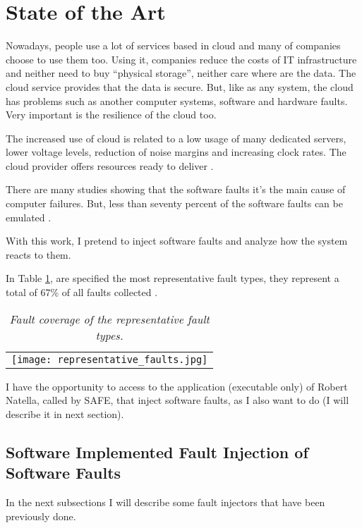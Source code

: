 \newpage
\section{State of the Art}

Nowadays, people use a lot of services based in cloud and many of companies choose to use them too. Using it, companies reduce the costs of IT infrastructure and neither need to buy ``physical storage'', neither care where are the data. The cloud service provides that the data is secure.
But, like as any system, the cloud has problems such as another computer systems, software and hardware faults. Very important is the resilience of the cloud too.

The increased use of cloud is related to a low usage of many dedicated servers, lower voltage levels, reduction of noise margins and increasing clock rates. The cloud provider offers resources ready to deliver \cite{wolter2012resilience}.

There are many studies showing that the software faults\cite{avizzienisbasic} it's the main cause of computer failures. But, less than seventy percent of the software faults can be emulated \cite{madeira2000emulation}.

With this work, I pretend to inject software faults and analyze how the system reacts to them.

In Table \ref{tab:representative_faults}, are specified the most representative fault types, they represent a total of 67\% of all faults collected \cite{duraes2005thesis}.

\begin{table}[!ht]
\begin{tabular}{c}
\texttt{[image: representative\_faults.jpg]}
\end{tabular}
\caption{\small \sl Fault coverage of the representative fault types. \cite{duraes2005thesis} \label{tab:representative_faults}}
\end{table}





I have the opportunity to access to the application (executable only)
of Robert Natella, called by SAFE, that inject software faults, as I also want to do (I will describe it in next section).

\clearpage
\subsection{Software Implemented Fault Injection of Software Faults}
In the next subsections I will describe some fault injectors that have been previously done.\\

